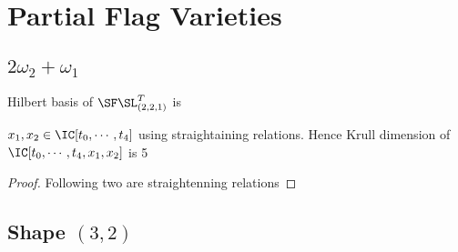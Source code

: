 \section{Partial Flag Varieties}
\subsection{\(2\omega_2 + \omega_1\)}
Hilbert basis of \(\SF\SL_{(2,2,1)}^T\) is 

\begin{lemma}
    \(x_1,x_2 \in \IC[t_0,\cdots,t_4]\) using straightaining relations. Hence Krull dimension of \(\IC[t_0,\cdots,t_4,x_1,x_2]\) is 5
\end{lemma}
\begin{proof}
    Following two are straightenning relations
\end{proof}
\subsection{Shape \((3,2)\)}
